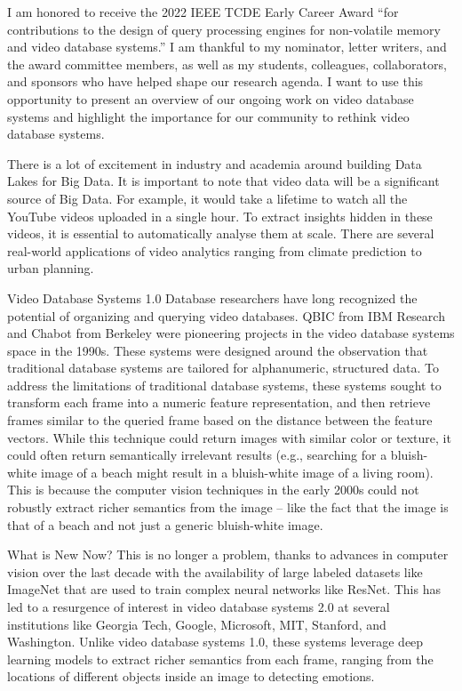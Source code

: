 \documentclass[11pt]{article}
\begin{document}
I am honored to receive the 2022 IEEE TCDE Early Career Award “for contributions to the design of query processing engines for non-volatile memory and video database systems.” I am thankful to my nominator, letter writers, and the award committee members, as well as my students, colleagues, collaborators, and sponsors who have helped shape our research agenda. I want to use this opportunity to present an overview of our ongoing work on video database systems and highlight the importance for our community to rethink video database systems.

There is a lot of excitement in industry and academia around building Data Lakes for Big Data. It is important to note that video data will be a significant source of Big Data. For example, it would take a lifetime to watch all the YouTube videos uploaded in a single hour. To extract insights hidden in these videos, it is essential to automatically analyse them at scale. There are several real-world applications of video analytics ranging from climate prediction to urban planning.

Video Database Systems 1.0
Database researchers have long recognized the potential of organizing and querying video databases. QBIC from IBM Research and Chabot from Berkeley were pioneering projects in the video database systems space in the 1990s. These systems were designed around the observation that traditional database systems are tailored for alphanumeric, structured data. To address the limitations of traditional database systems, these systems sought to transform each frame into a numeric feature representation, and then retrieve frames similar to the queried frame based on the distance between the feature vectors. While this technique could return images with similar color or texture, it could often return semantically irrelevant results (e.g., searching for a bluish-white image of a beach might result in a bluish-white image of a living room). This is because the computer vision techniques in the early 2000s could not robustly extract richer semantics from the image – like the fact that the image is that of a beach and not just a generic bluish-white image.

What is New Now?
This is no longer a problem, thanks to advances in computer vision over the last decade with the availability of large labeled datasets like ImageNet that are used to train complex neural networks like ResNet. This has led to a resurgence of interest in video database systems 2.0 at several institutions like Georgia Tech, Google, Microsoft, MIT, Stanford, and Washington. Unlike video database systems 1.0, these systems leverage deep learning models to extract richer semantics from each frame, ranging from the locations of different objects inside an image to detecting emotions.
\end{document}
